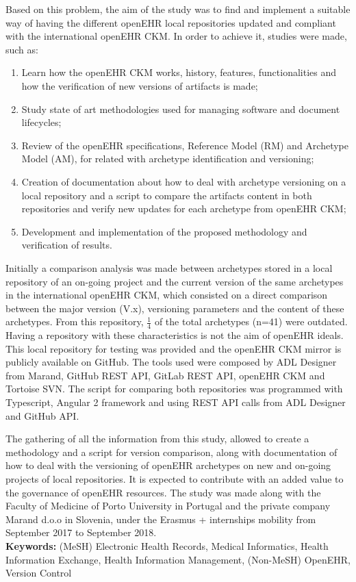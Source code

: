 \documentclass[mim_thesis.tex]{subfiles}
\begin{document}
Based on this problem, the aim of the study was to find and implement a suitable way of having the different openEHR local repositories updated and compliant with the international openEHR CKM. In order to achieve it, studies were made, such as: 
\begin{enumerate} [noitemsep]
\item Learn how the openEHR CKM works, history, features, functionalities and 
how the verification of new versions of artifacts is made;  
\item Study state of art methodologies used for managing software and document 
lifecycles;  
\item Review of the openEHR specifications,  Reference Model (RM) and 
Archetype Model (AM), for related with archetype identification and versioning; 
\item Creation of documentation about how to deal with archetype versioning on a 
local repository and a script to compare the artifacts content in both 
repositories and verify new updates for each archetype from openEHR CKM; 
\item Development and implementation of the proposed methodology and 
verification of results.
\end{enumerate}

Initially  a comparison analysis was made between archetypes stored in a local repository of an on-going project and the current version of the same archetypes in the international openEHR CKM, which consisted on a direct comparison between the major version (V.x), versioning parameters and the content of these archetypes. From this repository, \( \frac{1}{4} \) of the total archetypes (n=41) were outdated. Having a repository with these characteristics is not the aim of openEHR ideals. This local repository for testing was provided and the openEHR CKM mirror is publicly available on GitHub. The tools used were composed by ADL Designer from Marand, GitHub REST API, GitLab REST API, openEHR CKM and Tortoise SVN. The script for comparing both repositories was programmed with Typescript, Angular 2 framework and using REST API calls from ADL Designer and GitHub API.

The gathering of all the information from this study, allowed to 
create a methodology and a script for version comparison, along with documentation of how to deal with the versioning of openEHR archetypes on new and on-going projects of local repositories. It is expected to contribute with an added value to the governance of openEHR resources. The study was made along with the Faculty of Medicine of Porto University in Portugal and the private company Marand d.o.o in Slovenia, under the Erasmus + internships mobility from September 2017 to September 2018.\\

\textbf{Keywords:} (MeSH) Electronic Health Records, Medical Informatics, Health Information 
Exchange, Health Information Management, (Non-MeSH) OpenEHR, Version Control 
\end{document}
